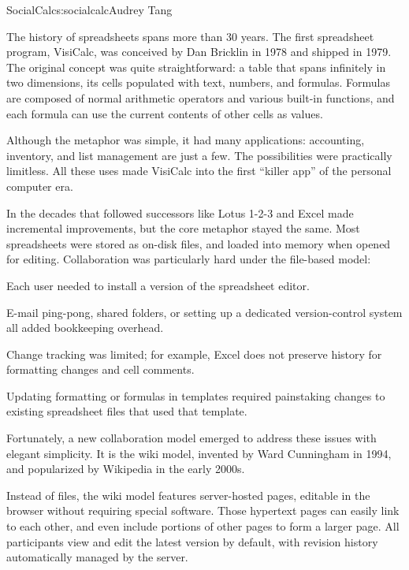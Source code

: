 \begin{aosachapter}{SocialCalc}{s:socialcalc}{Audrey Tang}

The history of spreadsheets spans more than 30 years.  The first
spreadsheet program, VisiCalc, was conceived by Dan Bricklin in 1978
and shipped in 1979.  The original concept was quite straightforward:
a table that spans infinitely in two dimensions, its cells populated
with text, numbers, and formulas.  Formulas are composed of normal
arithmetic operators and various built-in functions, and each formula
can use the current contents of other cells as values.

Although the metaphor was simple, it had many applications:
accounting, inventory, and list management
are just a few.  The possibilities were practically limitless.  All
these uses made VisiCalc into the first ``killer app'' of the
personal computer era.

In the decades that followed successors like Lotus 1-2-3 and Excel
made incremental improvements, but the core metaphor stayed the same.
Most spreadsheets were stored as on-disk files, and loaded into memory
when opened for editing.  Collaboration was particularly hard under
the file-based model:

\begin{aosaitemize}

  \item Each user needed to install a version of the spreadsheet editor.

  \item E-mail ping-pong, shared folders, or setting up a dedicated
  version-control system all added bookkeeping overhead.

  \item Change tracking was limited; for example, Excel does not preserve
  history for formatting changes and cell comments.

  \item Updating formatting or formulas in templates required
  painstaking changes to existing spreadsheet files that used that
  template.

\end{aosaitemize}

Fortunately, a new collaboration model emerged to address these issues
with elegant simplicity.  It is the wiki model, invented by Ward
Cunningham in 1994, and popularized by Wikipedia in the early 2000s.

Instead of files, the wiki model features server-hosted pages,
editable in the browser without requiring special software.  Those
hypertext pages can easily link to each other, and even include
portions of other pages to form a larger page.  All participants view
and edit the latest version by default, with revision history
automatically managed by the server.


\end{aosachapter}
